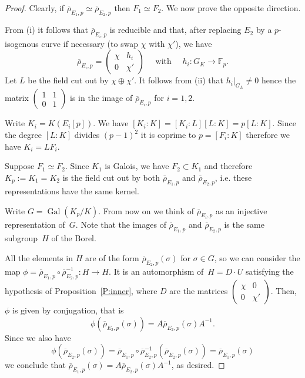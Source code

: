\documentclass[12pt]{amsart}
\newcommand{\F}{\mathbb{F}}
\newcommand{\rhobar}{{\overline{\rho}}}
\DeclareMathOperator{\Gal}{Gal}
\numberwithin{equation}{section}
\theoremstyle{definition}
\theoremstyle{remark}
\begin{document}
\begin{proof} Clearly, 
if $\rhobar_{E_1,p} \simeq \rhobar_{E_2,p}$ 
then $F_1 \simeq F_2$. We now prove the opposite direction.

From (i) it follows that $\rhobar_{E_i,p}$ is reducible and that, after replacing $E_2$ by a $p$-isogenous curve if necessary (to swap 
$\chi$ with $\chi'$), 
we have 
\[
\rhobar_{E_i,p} =  \begin{pmatrix}
                            \chi & h_i \\
                            0 & \chi'
                            \end{pmatrix} \quad \text{ with } \quad  h_i : G_K \to \F_p.  
\]
Let $L$ be the field cut out 
by $\chi \oplus \chi'$. 
It follows from (ii) that $h_i|_{G_L} \neq 0$ 
hence the matrix $\left(\begin{smallmatrix}
                            1 & 1 \\
                            0 & 1
                            \end{smallmatrix} \right)$  
is in the image of $\rhobar_{E_i,p}$ for $i=1,2$.
                            
Write $K_i = K(E_i[p])$. 
We have $[K_i : K] = [K_i : L][L : K] = p [L : K]$. 
Since the degree $[L : K]$ divides $(p-1)^2$ it is coprime 
to $p = [F_i : K]$ therefore we have $K_i = L F_i$.

Suppose $F_1 \simeq F_2$. Since $K_1$ is Galois, we have $F_2 \subset K_1$ and therefore $K_p := K_1 = K_2$ is the field cut out by both
$\rhobar_{E_1,p}$ and $\rhobar_{E_2,p}$, i.e. these representations have the same kernel.

Write $G = \Gal(K_p / K)$. From now on we think of $\rhobar_{E_i,p}$ as an injective representation of~$G$. Note that the images of $\rhobar_{E_1,p}$ and $\rhobar_{E_2,p}$
is the same subgroup~$H$ of the Borel.

All the elements in $H$ are of the form $\rhobar_{E_2,p}(\sigma)$ for $\sigma \in G$, so we can consider the map $\phi = \rhobar_{E_1,p} \circ \rhobar_{E_2,p}^{-1} : H \to H$. It is an automorphism of~$H = D\cdot U$ satisfying the hypothesis of Proposition~\ref{P:inner}, where $D$ are 
the matrices $\left(\begin{smallmatrix}
                            \chi & 0 \\
                            0 & \chi'
                            \end{smallmatrix} \right)$.  
Then, $\phi$ is given by conjugation, that is
\[
 \phi(\rhobar_{E_2,p}(\sigma)) = A \rhobar_{E_2,p}(\sigma) A^{-1}.
\]
Since we also have
\[ 
\phi(\rhobar_{E_2,p}(\sigma)) 
=  \rhobar_{E_1,p} \circ \rhobar_{E_2,p}^{-1}(\rhobar_{E_2,p}(\sigma)) = \rhobar_{E_1,p}(\sigma)
\]
we conclude that $\rhobar_{E_1,p}(\sigma) = A \rhobar_{E_2,p}(\sigma) A^{-1}$, as desired.
\end{proof}
\end{document}
